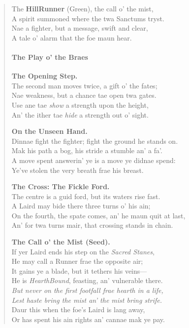 \documentclass[11pt]{article}
\begin{document}
\begin{quote}
The \textbf{Hill\textendash Runner} (Green), the call o' the mist,\\
A spirit summoned where the twa Sanctums tryst.\\
Nae a fighter, but a message, swift and clear,\\
A tale o' alarm that the foe maun hear.

\paragraph{The Play o' the Braes}
\textbf{The Opening Step.}\\
The second man moves twice, a gift o' the fates;\\
Nae weakness, but a chance tae open twa gates.\\
Use ane tae \emph{show} a strength upon the height,\\
An' the ither tae \emph{hide} a strength out o' sight.

\textbf{On the Unseen Hand.}\\
Dinnae fight the fighter; fight the ground he stands on.\\
Mak his path a bog, his stride a stumble an' a fa'.\\
A move spent answerin' ye is a move ye didnae spend:\\
Ye've stolen the very breath frae his breast.

\textbf{The Cross: The Fickle Ford.}\\
The centre is a guid ford, but its waters rise fast.\\
A Laird may bide there three turns o' his ain;\\
On the fourth, the spate comes, an' he maun quit at last,\\
An' for twa turns mair, that crossing stands in chain.

\textbf{The Call o' the Mist (Seed).}\\
If yer Laird ends his step on the \emph{Sacred Stanes},\\
He may call a Runner frae the opposite air;\\
It gains ye a blade, but it tethers his veins—\\
He is \emph{Hearth\textendash Bound}, feasting, an' vulnerable there.\\
\emph{But never on the first footfall frae hearth in a life,}\\
\emph{Lest haste bring the mist an' the mist bring strife.}\\
Daur this when the foe's Laird is lang away,\\
Or has spent his ain rights an' cannae mak ye pay.


\end{quote}
\end{document}
